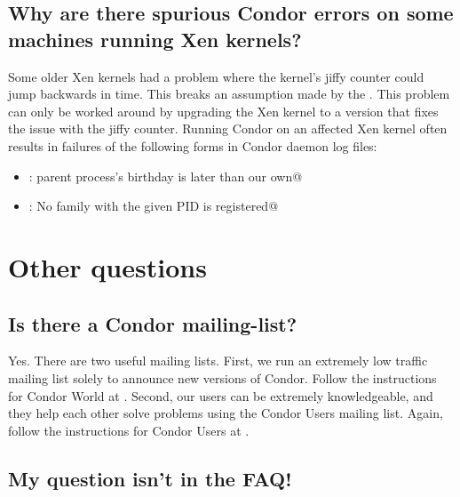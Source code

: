 \subsection*{\label{sec:xen-jiffies-bug}Why are there spurious Condor errors on some machines running Xen kernels?}

Some older Xen kernels had a problem where the kernel's jiffy counter
could jump backwards in time. This breaks an assumption made by the
. This problem can only be worked around by upgrading
the Xen kernel to a version that fixes the issue with the jiffy counter.
Running Condor on an affected Xen kernel often results in failures
of the following forms in Condor daemon log files:
\begin{itemize}
\item \verb@error: parent process's birthday is later than our own@
\item \verb@ERROR: No family with the given PID is registered@
\end{itemize}

\section{Other questions}


\subsection*{Is there a Condor mailing-list?}

Yes. There are two useful mailing lists.
First, we run an extremely low traffic mailing list solely to announce new
versions of Condor.
Follow the instructions for Condor World at
.
Second, our users can be extremely knowledgeable,
and they help each other solve problems
using the Condor Users mailing list.
Again, follow the instructions for Condor Users at
.



\subsection*{My question isn't in the FAQ!}

